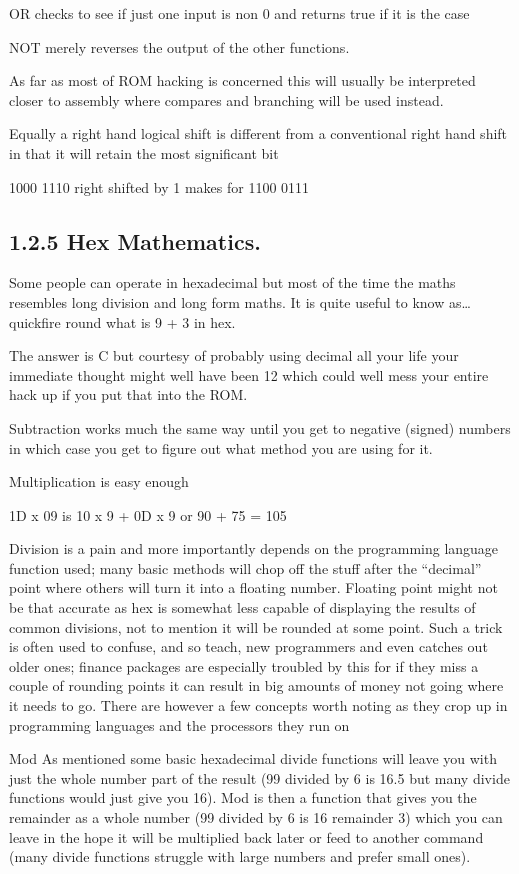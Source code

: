 \documentclass[
]{book}
\begin{document}
OR checks to see if just one input is non 0 and returns true if it is the case

NOT merely reverses the output of the other functions.

As far as most of ROM hacking is concerned this will usually be interpreted closer to assembly where compares and branching will be used instead.

Equally a right hand logical shift is different from a conventional right hand shift in that it will retain the most significant bit

1000 1110 right shifted by 1 makes for 1100 0111

\hypertarget{hex-mathematics.}{%
\subsection{1.2.5 Hex Mathematics.}\label{hex-mathematics.}}

Some people can operate in hexadecimal but most of the time the maths resembles long division and long form maths. It is quite useful to know as\ldots{} quickfire round what is 9 + 3 in hex.

The answer is C but courtesy of probably using decimal all your life your immediate thought might well have been 12 which could well mess your entire hack up if you put that into the ROM.

Subtraction works much the same way until you get to negative (signed) numbers in which case you get to figure out what method you are using for it.

Multiplication is easy enough

1D x 09 is 10 x 9 + 0D x 9 or 90 + 75 = 105

Division is a pain and more importantly depends on the programming language function used; many basic methods will chop off the stuff after the ``decimal'' point where others will turn it into a floating number. Floating point might not be that accurate as hex is somewhat less capable of displaying the results of common divisions, not to mention it will be rounded at some point. Such a trick is often used to confuse, and so teach, new programmers and even catches out older ones; finance packages are especially troubled by this for if they miss a couple of rounding points it can result in big amounts of money not going where it needs to go. There are however a few concepts worth noting as they crop up in programming languages and the processors they run on

Mod As mentioned some basic hexadecimal divide functions will leave you with just the whole number part of the result (99 divided by 6 is 16.5 but many divide functions would just give you 16). Mod is then a function that gives you the remainder as a whole number (99 divided by 6 is 16 remainder 3) which you can leave in the hope it will be multiplied back later or feed to another command (many divide functions struggle with large numbers and prefer small ones).
\end{document}
